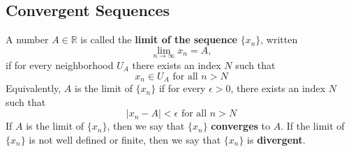 \documentclass{article}
\begin{document}
  \subsection{Convergent Sequences}
  
    \begin{definition}
      A number $A \in \mathbb{R}$ is called the \textbf{limit of the sequence} $\{x_n\}$, written 
      \[ \lim_{n \rightarrow \infty} x_n = A,\]
      if for every neighborhood $U_A$ there exists an index $N$ such that 
      \[x_n \in U_A \text{ for all } n > N\]
      Equivalently, $A$ is the limit of $\{x_n\}$ if for every $\epsilon>0$, there exists an index $N$ such that
      \[ |x_n - A| < \epsilon \text{ for all } n > N\]
      If $A$ is the limit of $\{x_n\}$, then we say that $\{x_n\}$ \textbf{converges} to $A$. If the limit of $\{x_n\}$ is not well defined or finite, then we say that $\{x_n\}$ is \textbf{divergent}. 
    \end{definition}
\end{document}
